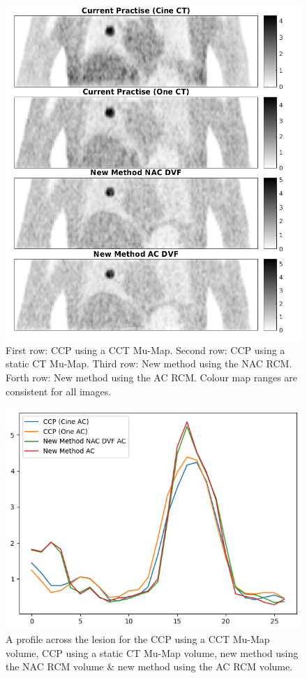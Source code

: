     \begin{figure}
        \centering
        \includegraphics[width=0.75\linewidth]{figures/visual_analysis.png}
        \captionsetup{singlelinecheck=false, justification=centering}
        \caption{First row: \gls{CCP} using a \gls{CCT} \gls{Mu-Map}. Second row: \gls{CCP} using a static \gls{CT} \gls{Mu-Map}. Third row: New method using the \gls{NAC} \gls{RCM}. Forth row: New method using the \gls{AC} \gls{RCM}. Colour map ranges are consistent for all images.}
        \label{fig:visual_analysis}
    \end{figure}
    
    \begin{figure}
        \centering
        \includegraphics[width=0.5\linewidth]{figures/profile.png}
        \captionsetup{singlelinecheck=false, justification=centering}
        \caption{A profile across the lesion for the \gls{CCP} using a \gls{CCT} \gls{Mu-Map} volume, \gls{CCP} using a static \gls{CT} \gls{Mu-Map} volume, new method using the \gls{NAC} \gls{RCM} volume \& new method using the \gls{AC} \gls{RCM} volume.}
        \label{fig:profile}
    \end{figure}
    
